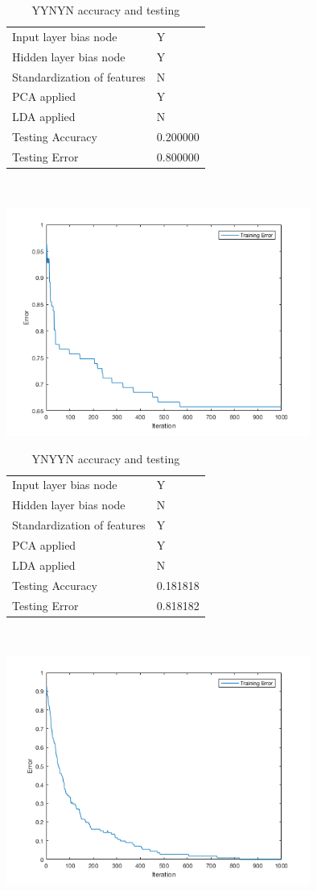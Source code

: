 \documentclass[12pt]{article}
\newcommand{\accuracyAndTestErrorTable}[8]{
  \begin{tabular}{l|l}
    \hline
    Input layer bias node & #1 \\
    Hidden layer bias node & #2 \\
    Standardization of features & #3 \\
    PCA applied & #4 \\
    LDA applied & #5 \\
    \hline
    Testing Accuracy & #6 \\
    Testing Error & #7 \\
    \hline
  \end{tabular}
  ~\\[60pt]
  \caption{#8}
}
\begin{document}
\begin{center}
  \begin{table}[H]
    \begin{varwidth}[b]{0.4\linewidth}
      \centering
      \accuracyAndTestErrorTable{Y}{Y}{N}{Y}{N}{0.200000}{0.800000}{YYNYN accuracy and testing}
      \label{table:YYNYN}
    \end{varwidth}%
    \hfill
    \begin{minipage}[b]{0.6\linewidth}
      \centering
      \includegraphics[width=100mm]{YYNYN_training_error.png}
      \label{fig:YYNYN}
    \end{minipage}
  \end{table}
\end{center}




\begin{center}
  \begin{table}[H]
    \begin{varwidth}[b]{0.4\linewidth}
      \centering
      \accuracyAndTestErrorTable{Y}{N}{Y}{Y}{N}{0.181818}{0.818182}{YNYYN accuracy and testing}
      \label{table:YNYYN}
    \end{varwidth}%
    \hfill
    \begin{minipage}[b]{0.6\linewidth}
      \centering
      \includegraphics[width=100mm]{YNYYN_training_error.png}
      \label{fig:YNYYN}
    \end{minipage}
  \end{table}
\end{center}
\end{document}

